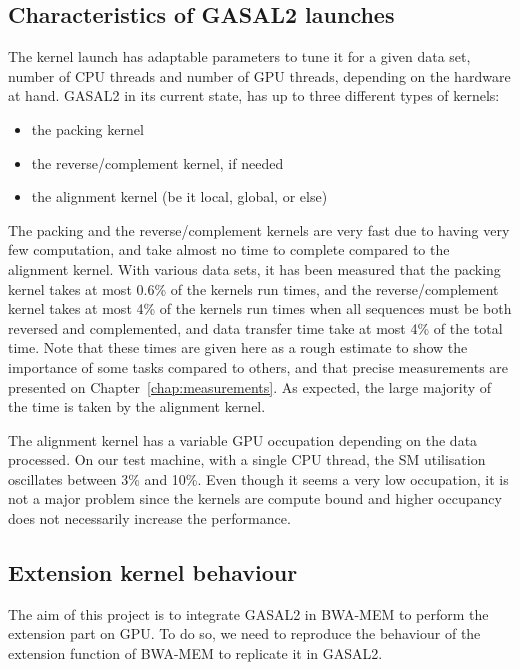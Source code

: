\subsection{Characteristics of GASAL2 launches}

The kernel launch has adaptable parameters to tune it for a given data set, number of CPU threads and number of GPU threads, depending on the hardware at hand. GASAL2 in its current state, has up to three different types of kernels:

\begin{itemize}
	\item the packing kernel
	\item the reverse/complement kernel, if needed
	\item the alignment kernel (be it local, global, or else)
\end{itemize}

The packing and the reverse/complement kernels are very fast due to having very few computation, and take almost no time to complete compared to the alignment kernel. With various data sets, it has been measured that the packing kernel takes at most 0.6\% of the kernels run times, and the reverse/complement kernel takes at most 4\% of the kernels run times when all sequences must be both reversed and complemented, and data transfer time take at most 4\% of the total time. Note that these times are given here as a rough estimate to show the importance of some tasks compared to others, and that precise measurements are presented on Chapter~\ref{chap:measurements}. As expected, the large majority of the time is taken by the alignment kernel.

The alignment kernel has a variable GPU occupation depending on the data processed. On our test machine, with a single CPU thread, the SM utilisation oscillates between 3\% and 10\%. Even though it seems a very low occupation, it is not a major problem since the kernels are compute bound and higher occupancy does not necessarily increase the performance.


\subsection{Extension kernel behaviour}
\label{sec:seedonly}
The aim of this project is to integrate GASAL2 in BWA-MEM to perform the extension part on GPU. To do so, we need to reproduce the behaviour of the extension function of BWA-MEM to replicate it in GASAL2.

